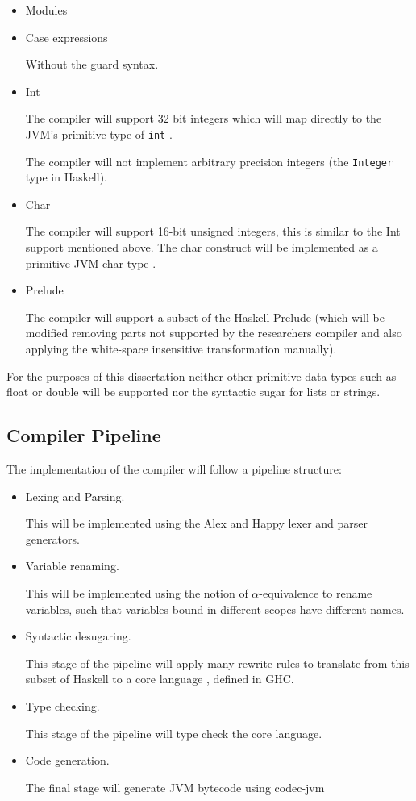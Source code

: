 \documentclass[a4paper,12pt]{article}
\begin{document}
\begin{itemize}
    \item Modules 

    \item Case expressions 
      
      Without the guard syntax.

    \item Int

      The compiler will support 32 bit integers which will map directly to the JVM's primitive type of \texttt{int} \cite{jvm-spec8}.

      The compiler will not implement arbitrary precision integers (the \texttt{Integer} type in Haskell).

    \item Char

      The compiler will support 16-bit unsigned integers, this is similar to the Int support mentioned above. The char construct will be implemented as a 
      primitive JVM char type \cite{jvm-spec8}.

    \item Prelude

      The compiler will support a subset of the Haskell Prelude (which will be modified removing parts not supported by the researchers compiler 
      and also applying the white-space insensitive transformation manually).

  \end{itemize}
  For the purposes of this dissertation neither other primitive data types such as float or double will be supported nor the syntactic sugar for lists or strings.

  \subsection*{Compiler Pipeline}
  The implementation of the compiler will follow a pipeline structure:

  \begin{itemize}
    \item Lexing and Parsing.

      This will be implemented using the Alex and Happy lexer and parser generators.
    \item Variable renaming.

      This will be implemented using the notion of $\alpha$-equivalence to rename variables, such that variables bound in different scopes have different names.
    \item Syntactic desugaring.

      This stage of the pipeline will apply many rewrite rules to translate from this subset of Haskell to a core language \cite{typedcorelink}, defined in GHC.
    \item Type checking.

     This stage of the pipeline will type check the core language.
    \item Code generation.

     The final stage will generate JVM bytecode using codec-jvm \cite{codec-jvm-link}
  \end{itemize}
\end{document}
